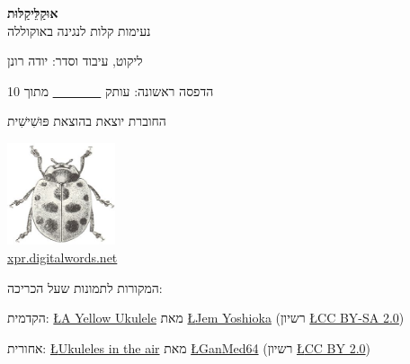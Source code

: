 \begin{center}
	\textbf{אוּקַלֵּיקַלּוּת}\\
	נעימות קלות לנגינה באוקוללה

	ליקוט, עיבוד וסדר: יודה רונן

	\vfill

	הדפסה ראשונה: עותק \underline{~ ~ ~ ~ ~} מתוך 10

	\vfill

	החוברת יוצאת בהוצאת פּוּשִׁישִׁית

	\includegraphics[height=3cm]{"puŝiŝit.png"}\\
	\url{xpr.digitalwords.net}

	\vfill

	המקורות לתמונות שעל הכריכה:


	הקדמית: \href{https://www.flickr.com/photos/jemshed/6423813619/}{\L{A Yellow Ukulele}} מאת \href{https://www.flickr.com/photos/jemshed/}{\L{Jem Yoshioka}} (רשיון \href{https://creativecommons.org/licenses/by-sa/2.0/}{\L{CC BY-SA 2.0}})

	אחורית: \href{https://www.flickr.com/photos/ganmed64/3645911185/}{\L{Ukuleles in the air}} מאת \href{https://www.flickr.com/photos/ganmed64/}{\L{GanMed64}} (רשיון \href{https://creativecommons.org/licenses/by/2.0/}{\L{CC BY 2.0}})
\end{center}
